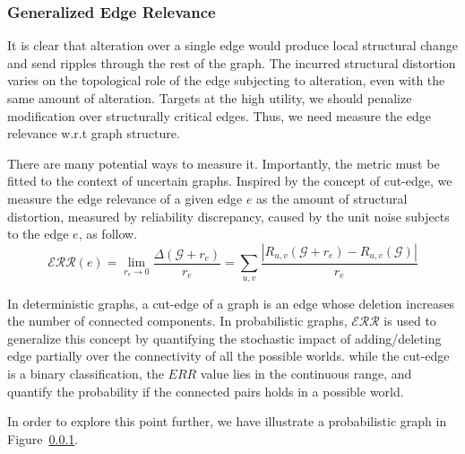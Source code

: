 \subsubsection{Generalized Edge Relevance}

It is clear that alteration over a single edge would produce local structural change and send ripples through the rest of the graph. 
The incurred structural distortion varies on the topological role of the edge subjecting to alteration, even with the same amount of alteration. 
Targets at the high utility, we should penalize modification over structurally critical edges.  
Thus, we need measure the edge relevance w.r.t graph structure. 

There are many potential ways to measure it. 
Importantly, the metric must be fitted to the context of uncertain graphs.
Inspired by the concept of cut-edge, we measure the edge relevance of a given edge $e$
as the amount of structural distortion, measured by reliability discrepancy, caused by the unit noise subjects to the edge $e$, as follow. 
\begin{equation*}
    \mathcal{ERR}({e}) = \lim_{r_{e} \rightarrow 0} \frac{\Delta(\mathcal{G}+r_{e})}{r_{e}} 
                      = \sum_{u,v} \frac{|R_{u,v}(\mathcal{G}+r_{e}) -R_{u,v}(\mathcal{G})|} {r_{e}}
\end{equation*}

In deterministic graphs, a cut-edge of a graph is an edge whose deletion increases the number of connected components. 
In probabilistic graphs, $\mathcal{ERR}$ is used to generalize this concept by quantifying the stochastic impact of adding/deleting edge partially over the connectivity of all the possible worlds.
while the cut-edge is a binary classification, the $ERR$ value lies in the continuous range, and quantify the probability if the connected pairs holds in a possible world. 

In order to explore this point further, we have illustrate a probabilistic graph in Figure~\ref{}. 


